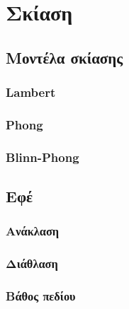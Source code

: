 \chapter{Σκίαση}

\begin{sloppypar}

\section{Μοντέλα σκίασης}

\subsection{Lambert}

\subsection{Phong}

\subsection{Blinn-Phong}

\section{Εφέ}

\subsection{Ανάκλαση}

\subsection{Διάθλαση}

\subsection{Βάθος πεδίου}

\end{sloppypar}

